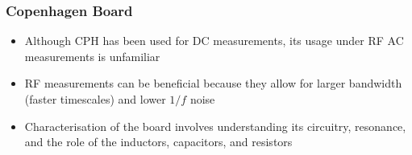 \documentclass{beamer}
\begin{document}
\begin{frame}
    \frametitle{Copenhagen Board}

    \begin{itemize}
        \item Although CPH has been used for DC measurements, its usage under RF AC measurements is unfamiliar
        \item RF measurements can be beneficial because they allow for larger bandwidth (faster timescales) and lower $1/f$ noise
        \item Characterisation of the board involves understanding its circuitry, resonance, and the role of the inductors, capacitors, and resistors
    \end{itemize}

\end{frame}
\end{document}
